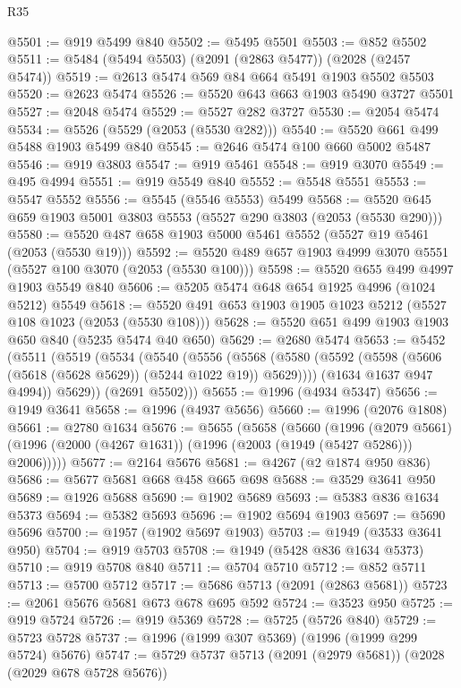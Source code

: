 \begin{lexlean}{R35}
\begin{coremodule}
@5501 := @919 @5499 @840
@5502 := @5495 @5501
@5503 := @852 @5502
@5511 := @5484 (@5494 @5503) (@2091 (@2863 @5477)) (@2028 (@2457 @5474))
@5519 := @2613 @5474 @569 @84 @664 @5491 @1903 @5502 @5503
@5520 := @2623 @5474
@5526 := @5520 @643 @663 @1903 @5490 @3727 @5501
@5527 := @2048 @5474
@5529 := @5527 @282 @3727
@5530 := @2054 @5474
@5534 := @5526 (@5529 (@2053 (@5530 @282)))
@5540 := @5520 @661 @499 @5488 @1903 @5499 @840
@5545 := @2646 @5474 @100 @660 @5002 @5487
@5546 := @919 @3803
@5547 := @919 @5461
@5548 := @919 @3070
@5549 := @495 @4994
@5551 := @919 @5549 @840
@5552 := @5548 @5551
@5553 := @5547 @5552
@5556 := @5545 (@5546 @5553) @5499
@5568 := @5520 @645 @659 @1903 @5001 @3803 @5553 (@5527 @290 @3803 (@2053 (@5530 @290)))
@5580 := @5520 @487 @658 @1903 @5000 @5461 @5552 (@5527 @19 @5461 (@2053 (@5530 @19)))
@5592 := @5520 @489 @657 @1903 @4999 @3070 @5551 (@5527 @100 @3070 (@2053 (@5530 @100)))
@5598 := @5520 @655 @499 @4997 @1903 @5549 @840
@5606 := @5205 @5474 @648 @654 @1925 @4996 (@1024 @5212) @5549
@5618 := @5520 @491 @653 @1903 @1905 @1023 @5212 (@5527 @108 @1023 (@2053 (@5530 @108)))
@5628 := @5520 @651 @499 @1903 @1903 @650 @840 (@5235 @5474 @40 @650)
@5629 := @2680 @5474
@5653 := @5452
    (@5511
      (@5519
        (@5534
          (@5540
            (@5556
              (@5568 (@5580 (@5592 (@5598 (@5606 (@5618 (@5628 @5629)) (@5244 @1022 @19)) @5629))))
              (@1634 @1637 @947 @4994))
            @5629))
        (@2691 @5502)))
@5655 := @1996 (@4934 @5347)
@5656 := @1949 @3641
@5658 := @1996 (@4937 @5656)
@5660 := @1996 (@2076 @1808)
@5661 := @2780 @1634
@5676 := @5655
    (@5658
      (@5660
        (@1996
          (@2079 @5661)
          (@1996 (@2000 (@4267 @1631)) (@1996 (@2003 (@1949 (@5427 @5286))) @2006)))))
@5677 := @2164 @5676
@5681 := @4267 (@2 @1874 @950 @836)
@5686 := @5677 @5681 @668 @458 @665 @698
@5688 := @3529 @3641 @950
@5689 := @1926 @5688
@5690 := @1902 @5689
@5693 := @5383 @836 @1634 @5373
@5694 := @5382 @5693
@5696 := @1902 @5694 @1903
@5697 := @5690 @5696
@5700 := @1957 (@1902 @5697 @1903)
@5703 := @1949 (@3533 @3641 @950)
@5704 := @919 @5703
@5708 := @1949 (@5428 @836 @1634 @5373)
@5710 := @919 @5708 @840
@5711 := @5704 @5710
@5712 := @852 @5711
@5713 := @5700 @5712
@5717 := @5686 @5713 (@2091 (@2863 @5681))
@5723 := @2061 @5676 @5681 @673 @678 @695 @592
@5724 := @3523 @950
@5725 := @919 @5724
@5726 := @919 @5369
@5728 := @5725 (@5726 @840)
@5729 := @5723 @5728
@5737 := @1996 (@1999 @307 @5369) (@1996 (@1999 @299 @5724) @5676)
@5747 := @5729 @5737 @5713 (@2091 (@2979 @5681)) (@2028 (@2029 @678 @5728 @5676))

\end{coremodule}
\end{lexlean}
